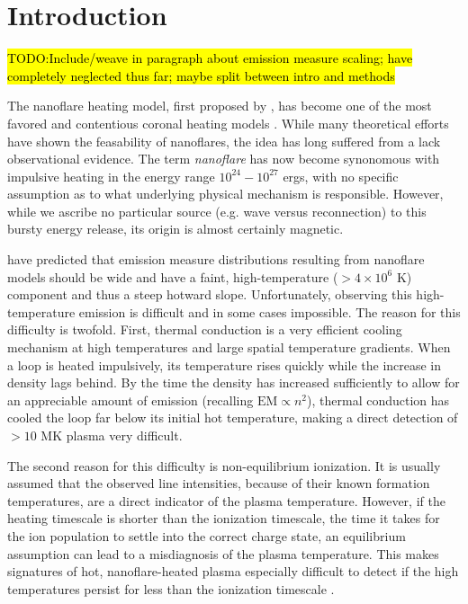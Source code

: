 \documentclass[tighten,apj]{emulateapj}
\begin{document}
	\section{Introduction}
	\label{sec:intro}
	\par\hl{TODO:Include/weave in paragraph about emission measure scaling; have completely neglected thus far; maybe split between intro and methods}
	\par The nanoflare heating model, first proposed by \citet{parker_nanoflares_1988}, has become one of the most favored and contentious coronal heating models \citep{cargill_implications_1994,cargill_nanoflare_2004,klimchuk_solving_2006}. While many theoretical efforts \citep[e.g.][]{bradshaw_diagnosing_2012,reep_diagnosing_2013} have shown the feasability of nanoflares, the idea has long suffered from a lack observational evidence. The term \textit{nanoflare} has now become synonomous with impulsive heating in the energy range $10^{24}-10^{27}$ ergs, with no specific assumption as to what underlying physical mechanism is responsible. However, while we ascribe no particular source (e.g. wave versus reconnection) to this bursty energy release, its origin is almost certainly magnetic.
	\par \citet{cargill_implications_1994,cargill_nanoflare_2004} have predicted that emission measure distributions resulting from nanoflare models should be wide and have a faint, high-temperature ($>4\times10^6$ K) component and thus a steep hotward slope. Unfortunately, observing this high-temperature emission is difficult and in some cases impossible. The reason for this difficulty is twofold. First, thermal conduction is a very efficient cooling mechanism at high temperatures and large spatial temperature gradients. When a loop is heated impulsively, its temperature rises quickly while the increase in density lags behind. By the time the density has increased sufficiently to allow for an appreciable amount of emission (recalling $\mathrm{EM}\propto n^2$), thermal conduction has cooled the loop far below its initial hot temperature, making a direct detection of $>10$ MK plasma very difficult. 
	\par The second reason for this difficulty is non-equilibrium ionization. It is usually assumed that the observed line intensities, because of their known formation temperatures, are a direct indicator of the plasma temperature. However, if the heating timescale is shorter than the ionization timescale, the time it takes for the ion population to settle into the correct charge state, an equilibrium assumption can lead to a misdiagnosis of the plasma temperature. This makes signatures of hot, nanoflare-heated plasma especially difficult to detect if the high temperatures persist for less than the ionization timescale \citep{bradshaw_explosive_2006,bradshaw_what_2011,reale_nonequilibrium_2008}.
\end{document}
